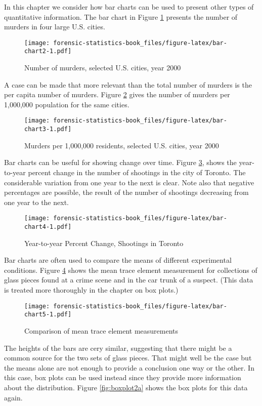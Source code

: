 \documentclass[
]{book}
\begin{document}
In this chapter we consider how bar charts can be used to present other
types of quantitative information. The bar chart in Figure \ref{fig:bar-chart2}
presents the number of murders in four large U.S. cities.

\begin{figure}
\centering
\texttt{[image: forensic-statistics-book\_files/figure-latex/bar-chart2-1.pdf]}
\caption{\label{fig:bar-chart2}Number of murders, selected U.S. cities, year 2000}
\end{figure}

A case can be made that more relevant than the total number of murders is
the per capita number of murders. Figure \ref{fig:bar-chart3} gives the
number of murders per 1,000,000 population for the same cities.

\begin{figure}
\centering
\texttt{[image: forensic-statistics-book\_files/figure-latex/bar-chart3-1.pdf]}
\caption{\label{fig:bar-chart3}Murders per 1,000,000 residents, selected U.S. cities, year 2000}
\end{figure}

Bar charts can be useful for showing change over time. Figure \ref{fig:bar-chart4},
shows the year-to-year percent change in the number of shootings in the city of
Toronto. The considerable variation from one year to the next is clear. Note also
that negative percentages are possible, the result of the number of shootings
decreasing from one year to the next.

\begin{figure}
\centering
\texttt{[image: forensic-statistics-book\_files/figure-latex/bar-chart4-1.pdf]}
\caption{\label{fig:bar-chart4}Year-to-year Percent Change, Shootings in Toronto}
\end{figure}

Bar charts are often used to compare the means of different experimental
conditions. Figure \ref{fig:bar-chart5} shows the mean trace element
measurement for collections of glass pieces found at a crime scene and
in the car trunk of a suspect. (This data is treated more thoroughly
in the chapter on box plots.)

\begin{figure}
\centering
\texttt{[image: forensic-statistics-book\_files/figure-latex/bar-chart5-1.pdf]}
\caption{\label{fig:bar-chart5}Comparison of mean trace element measurements}
\end{figure}

The heights of the bars are cery similar, suggesting that there might be
a common source for the two sets of glass pieces. That might well be the
case but the means alone are not enough to provide a conclusion one way or
the other. In this case, box plots can be used instead since they provide
more information about the distribution. Figure \ref{fig:boxplot2a}
shows the box plots for this data again.
\end{document}
